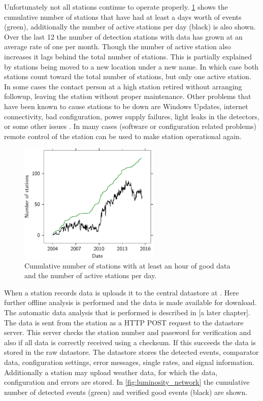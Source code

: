 Unfortunately not all stations continue to operate properly. \cref{fig:active_stations} shows the cumulative number of stations that have had at least a days worth of events (green), additionally the number of active stations per day (black) is also shown. Over the last \SI{12}{\year} the number of detection stations with data has grown at an average rate of one per month. Though the number of active station also increases it lags behind the total number of stations. This is partially explained by stations being moved to a new location under a new name. In which case both stations count toward the total number of stations, but only one active station. In some cases the contact person at a high station retired without arranging followup, leaving the station without proper maintenance. Other problems that have been known to cause stations to be down are Windows Updates, internet connectivity, bad configuration, power supply failures, light leaks in the detectors, or some other issues \cite{delaat2013maintenance}. In many cases (software or configuration related problems) remote control of the station can be used to make station operational again.

\begin{figure}
    \centering
    \includegraphics[width=0.6\textwidth]
                    {plots/cluster/active_stations}
    \caption{Cumulative number of stations with at least an hour of good data and the number of active stations per day.}
    \label{fig:active_stations}
\end{figure}

When a station records data is uploads it to the central datastore at \nikhef. Here further offline analysis is performed and the data is made available for download. The automatic data analysis that is performed is described in [a later chapter]. The data is sent from the station as a HTTP POST request to the datastore server. This server checks the station number and password for verification and also if all data is correctly received using a checksum. If this succeeds the data is stored in the raw datastore. The datastore stores the detected events, comparator data, configuration settings, error messages, single rates, and \gps signal information. Additionally a station may upload weather data, for which the data, configuration and errors are stored. In \cref{fig:luminosity_network} the cumulative number of detected events (green) and verified good events (black) are shown.

